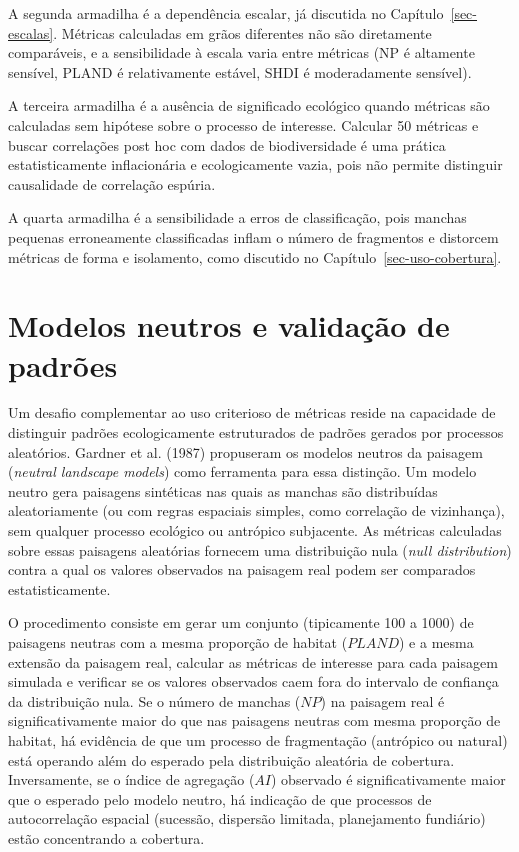 \documentclass[
  portuguese,
  11pt,
  a4paper,
  open=any]{scrbook}
\begin{document}
A segunda armadilha é a dependência escalar, já discutida no
Capítulo~\ref{sec-escalas}. Métricas calculadas em grãos diferentes não
são diretamente comparáveis, e a sensibilidade à escala varia entre
métricas (NP é altamente sensível, PLAND é relativamente estável, SHDI é
moderadamente sensível).

A terceira armadilha é a ausência de significado ecológico quando
métricas são calculadas sem hipótese sobre o processo de interesse.
Calcular 50 métricas e buscar correlações post hoc com dados de
biodiversidade é uma prática estatisticamente inflacionária e
ecologicamente vazia, pois não permite distinguir causalidade de
correlação espúria.

A quarta armadilha é a sensibilidade a erros de classificação, pois
manchas pequenas erroneamente classificadas inflam o número de
fragmentos e distorcem métricas de forma e isolamento, como discutido no
Capítulo~\ref{sec-uso-cobertura}.

\section{Modelos neutros e validação de
padrões}\label{modelos-neutros-e-validauxe7uxe3o-de-padruxf5es}

Um desafio complementar ao uso criterioso de métricas reside na
capacidade de distinguir padrões ecologicamente estruturados de padrões
gerados por processos aleatórios. Gardner et al. (1987) propuseram os
modelos neutros da paisagem (\emph{neutral landscape models}) como
ferramenta para essa distinção. Um modelo neutro gera paisagens
sintéticas nas quais as manchas são distribuídas aleatoriamente (ou com
regras espaciais simples, como correlação de vizinhança), sem qualquer
processo ecológico ou antrópico subjacente. As métricas calculadas sobre
essas paisagens aleatórias fornecem uma distribuição nula (\emph{null
distribution}) contra a qual os valores observados na paisagem real
podem ser comparados estatisticamente.

O procedimento consiste em gerar um conjunto (tipicamente 100 a 1000) de
paisagens neutras com a mesma proporção de habitat (\(PLAND\)) e a mesma
extensão da paisagem real, calcular as métricas de interesse para cada
paisagem simulada e verificar se os valores observados caem fora do
intervalo de confiança da distribuição nula. Se o número de manchas
(\(NP\)) na paisagem real é significativamente maior do que nas
paisagens neutras com mesma proporção de habitat, há evidência de que um
processo de fragmentação (antrópico ou natural) está operando além do
esperado pela distribuição aleatória de cobertura. Inversamente, se o
índice de agregação (\(AI\)) observado é significativamente maior que o
esperado pelo modelo neutro, há indicação de que processos de
autocorrelação espacial (sucessão, dispersão limitada, planejamento
fundiário) estão concentrando a cobertura.
\end{document}
